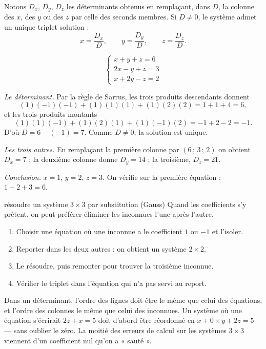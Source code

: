 \begin{theoreme}
Notons $D_{x}$, $D_{y}$, $D_{z}$ les déterminants obtenus en remplaçant,
dans $D$, la colonne des $x$, des $y$ ou des $z$ par celle des seconds
membres. Si $D \neq 0$, le système admet un unique triplet solution :
\[
  x = \frac{D_{x}}{D}, \qquad y = \frac{D_{y}}{D}, \qquad
  z = \frac{D_{z}}{D}.
\]
\end{theoreme}

\begin{exemple}
\[
  \begin{cases}
    x+y+z = 6\\
    2x-y+z = 3\\
    x+2y-z = 2
  \end{cases}
\]

\emph{Le déterminant.} Par la règle de Sarrus, les trois produits descendants
donnent
\[
  (1)(-1)(-1)+(1)(1)(1)+(1)(2)(2) = 1+1+4 = 6,
\]
et les trois produits montants
\[
  (1)(1)(-1)+(1)(2)(1)+(1)(-1)(2) = -1+2-2 = -1 .
\]
D'où $D = 6-(-1) = 7$.
Comme $D \neq 0$, la solution est unique.

\emph{Les trois autres.} En remplaçant la première colonne par
$(6\,;\,3\,;\,2)$ on obtient $D_{x} = 7$ ; la deuxième colonne donne
$D_{y} = 14$ ; la troisième, $D_{z} = 21$.

\emph{Conclusion.} $x = 1$, $y = 2$, $z = 3$. On vérifie sur la première
équation : $1+2+3 = 6$. \checkmark
\end{exemple}

\begin{methode}{résoudre un système $3\times3$ par substitution (Gauss)}
Quand les coefficients s'y prêtent, on peut préférer éliminer les inconnues
l'une après l'autre.
\begin{enumerate}[label=\textbf{\arabic*.}, leftmargin=*, itemsep=0.15em]
  \item Choisir une équation où une inconnue a le coefficient $1$ ou $-1$ et
        l'isoler.
  \item Reporter dans les deux autres : on obtient un système $2\times2$.
  \item Le résoudre, puis remonter pour trouver la troisième inconnue.
  \item Vérifier le triplet dans l'équation qui n'a pas servi au report.
\end{enumerate}
\end{methode}

\begin{erreurclassique}
Dans un déterminant, l'ordre des lignes doit être le même que celui des
équations, et l'ordre des colonnes le même que celui des inconnues. Un
système où une équation s'écrirait $2z+x = 5$ doit d'abord être réordonné en
$x+0\times y+2z = 5$ — sans oublier le zéro. La moitié des erreurs de calcul
sur les systèmes $3\times3$ viennent d'un coefficient nul qu'on a « sauté ».
\end{erreurclassique}


